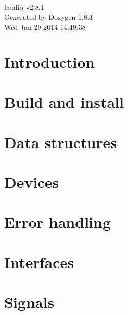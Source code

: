 \documentclass{book}
\begin{document}
\hypersetup{pageanchor=false,citecolor=blue}
\begin{titlepage}
\vspace*{7cm}
\begin{center}
{\Large faudio v2.8.1 }\\
\vspace*{1cm}
{\large Generated by Doxygen 1.8.3}\\
\vspace*{0.5cm}
{\small Wed Jan 29 2014 14:49:38}\\
\end{center}
\end{titlepage}
\clearemptydoublepage
{}
\tableofcontents
\clearemptydoublepage
{}
\hypersetup{pageanchor=true,citecolor=blue}
\chapter{Introduction}
\label{index}\hypertarget{index}{}
\chapter{Build and install}
\label{md_Build_and_install}
\hypertarget{md_Build_and_install}{}

\chapter{Data structures}
\label{md_Data_structures}
\hypertarget{md_Data_structures}{}

\chapter{Devices}
\label{md_Devices}
\hypertarget{md_Devices}{}

\chapter{Error handling}
\label{md_Error_handling}
\hypertarget{md_Error_handling}{}

\chapter{Interfaces}
\label{md_Interfaces}
\hypertarget{md_Interfaces}{}

\chapter{Signals}
\label{md_Signals}
\hypertarget{md_Signals}{}

\end{document}
